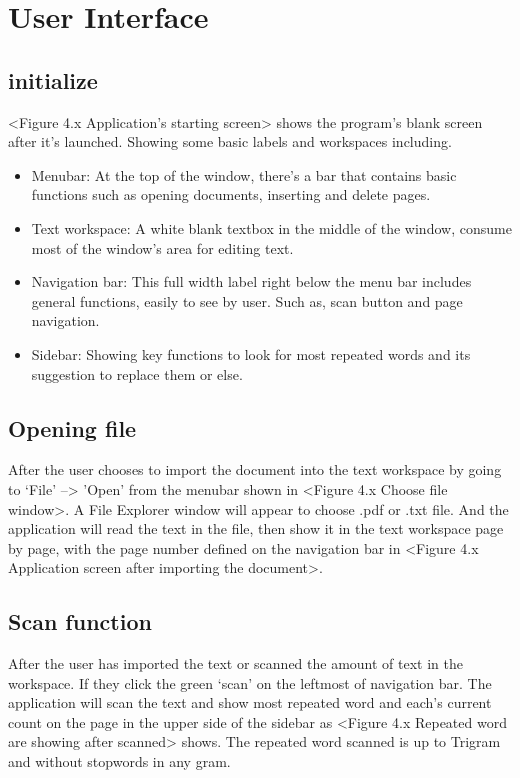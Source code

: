 \documentclass[12pt,oneside,openright,a4paper]{cpe-english-project}
\begin{document}
\section{User Interface}
\subsection{initialize}
<Figure 4.x Application’s starting screen>  shows the program’s blank screen after it’s launched. Showing some basic labels and workspaces including.
\begin{itemize}
\item Menubar: At the top of the window, there’s a bar that contains basic functions such as opening documents, inserting and delete pages.
\item Text workspace: A white blank textbox in the middle of the window, consume most of the window’s area for editing text.
\item Navigation bar: This full width label right below the menu bar includes general functions, easily to see by user. Such as, scan button and page navigation.
\item Sidebar: Showing key functions to look for most repeated words and its suggestion to replace them or
else.
\end{itemize}

\subsection{Opening file}
After the user chooses to import the document into the text workspace by going to ‘File’ –> ’Open’ from the menubar shown in <Figure 4.x Choose file window>. A File Explorer window will appear to choose .pdf or .txt file. And the application will read the text in the file, then show it in the text workspace page by page, with the page number defined on the navigation bar in <Figure 4.x Application screen after importing the document>.

\subsection{Scan function}
After the user has imported the text or scanned the amount of text in the workspace. If they click the green ‘scan’ on the leftmost of navigation bar. The application will scan the text and show most repeated word and each’s current count on the page in the upper side of the sidebar as <Figure 4.x Repeated word are showing after scanned> shows. The repeated word scanned is up to Trigram and without stopwords in any gram.
\end{document}
